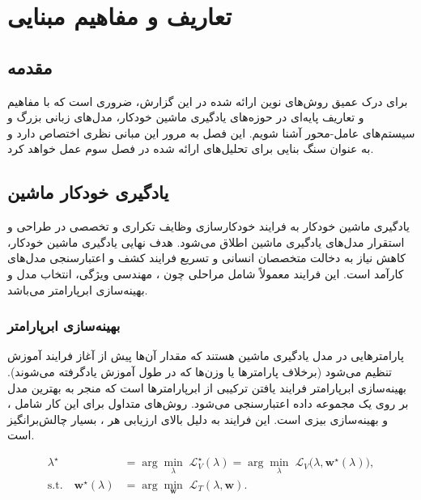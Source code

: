 
\chapter{تعاریف و مفاهیم مبنایی }
\thispagestyle{empty}
\section{مقدمه}
برای درک عمیق روش‌های نوین ارائه شده در این گزارش، ضروری است که با مفاهیم و تعاریف پایه‌ای در حوزه‌های یادگیری ماشین خودکار، مدل‌های زبانی بزرگ و سیستم‌های عامل-محور آشنا شویم. این فصل به مرور این مبانی نظری اختصاص دارد و به عنوان سنگ بنایی برای تحلیل‌های ارائه شده در فصل سوم عمل خواهد کرد.

\section{یادگیری خودکار ماشین}
یادگیری ماشین خودکار به فرایند خودکارسازی وظایف تکراری و تخصصی در طراحی و استقرار مدل‌های یادگیری ماشین اطلاق می‌شود. هدف نهایی یادگیری ماشین خودکار، کاهش نیاز به دخالت متخصصان انسانی و تسریع فرایند کشف و اعتبارسنجی مدل‌های کارآمد است. این فرایند معمولاً شامل مراحلی چون ، مهندسی ویژگی، انتخاب مدل و بهینه‌سازی ابرپارامتر می‌باشد.

\subsection{بهینه‌سازی ابرپارامتر}
 پارامترهایی در مدل یادگیری ماشین هستند که مقدار آن‌ها پیش از آغاز فرایند آموزش تنظیم می‌شود (برخلاف پارامترها یا وزن‌ها که در طول آموزش یادگرفته می‌شوند). بهینه‌سازی ابرپارامتر فرایند یافتن ترکیبی از ابرپارامترها است که منجر به بهترین  مدل بر روی یک مجموعه داده اعتبارسنجی می‌شود. روش‌های متداول برای این کار شامل ،  و بهینه‌سازی بیزی است. این فرایند به دلیل  بالای ارزیابی هر ، بسیار چالش‌برانگیز است.

\begin{align}
    \lambda^\star                              & = \arg\min_{\lambda}\; \mathcal{L}_V^\star(\lambda)
    = \arg\min_{\lambda}\; \mathcal{L}_V\!\big(\lambda, \mathbf{w}^\star(\lambda)\big) \label{eq:hpo-outer},                        \\
    \text{s.t.}\quad \mathbf{w}^\star(\lambda) & = \arg\min_{\mathbf{w}}\; \mathcal{L}_T(\lambda, \mathbf{w}) \label{eq:hpo-inner}.
\end{align}

